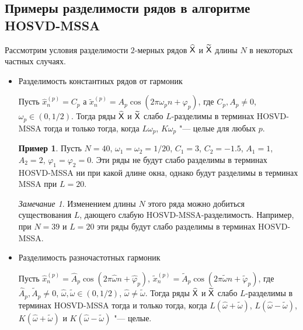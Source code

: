 \documentclass[specialist,
    substylefile=spbu.rtx,
    subf,href,colorlinks=true, 12pt]{disser}
\theoremstyle{plain}
\theoremstyle{definition}
\newtheorem{example}{Пример}[section]
\theoremstyle{remark}
\newtheorem*{remark}{Замечание}
\begin{document}
    \subsection{Примеры разделимости рядов в алгоритме HOSVD-MSSA}\label{subsec:hosvd-mssa-sep-example}
    Рассмотрим условия разделимости $2$-мерных рядов $\widehat{\mathsf{X}}$ и $\widetilde{\mathsf{X}}$ длины $N$ в некоторых
    частных случаях.
    \begin{itemize}
        \item Разделимость константных рядов от гармоник

        Пусть $\hat{x}_n^{(p)} = C_p$ а
        $\tilde{x}_n^{(p)} = A_p \cos(2\pi \omega_p n + \varphi_p)$,
        где $C_p, A_p \ne 0$, $\omega_p \in (0, 1/2)$.
        Тогда ряды $\widehat{\mathsf{X}}$ и $\widetilde{\mathsf{X}}$ слабо $L$-разделимы в терминах HOSVD-MSSA тогда и только тогда,
        когда $L\omega_p$, $K\omega_p$ "--- целые для любых $p$.
        \begin{example}
            \label{ex:no-sep}
            Пусть $N=40$, $\omega_1=\omega_2=1/20$, $C_1 = 3$, $C_2=-1.5$, $A_1 = 1$, $A_2 = 2$,
            $\varphi_1 = \varphi_2 = 0$.
            Эти ряды не будут слабо разделимы в терминах HOSVD-MSSA ни при какой длине окна, однако
            будут разделимы в терминах MSSA при $L=20$.
        \end{example}
        \begin{remark}
            Изменением длины $N$ этого ряда можно добиться существования $L$, дающего слабую HOSVD-MSSA-разделимость.
            Например, при $N=39$ и $L=20$ эти ряды будут слабо разделимы в терминах HOSVD-MSSA.
        \end{remark}

        \item Разделимость разночастотных гармоник

        Пусть $\hat{x}_n^{(p)} = \widehat{A}_p \cos(2 \pi \hat{\omega} n + \hat{\varphi}_p)$,
        $\tilde{x}_n^{(p)} = \widetilde{A}_p \cos(2\pi \tilde{\omega} n + \tilde{\varphi}_p)$,
        где $\widehat{A}_p, \widetilde{A}_p \ne 0$, \linebreak $\hat{\omega}, \tilde{\omega} \in (0, 1/2)$,
        $\hat{\omega} \ne \tilde{\omega}$.
        Тогда ряды $\widehat{\mathsf{X}}$ и $\widetilde{\mathsf{X}}$ слабо $L$-разделимы в терминах HOSVD-MSSA тогда и только тогда,
        когда $L(\hat{\omega} + \tilde{\omega})$, $L(\hat{\omega} - \tilde{\omega})$,
        $K(\hat{\omega} + \tilde{\omega})$ и $K(\hat{\omega} - \tilde{\omega})$ "--- целые.
    \end{itemize}
\end{document}
